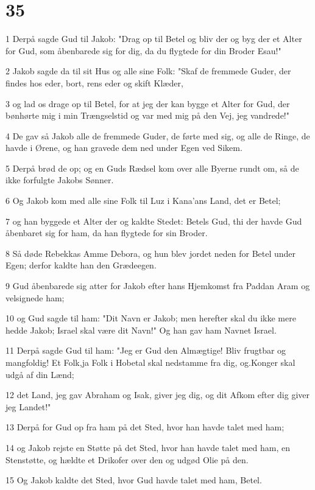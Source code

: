 \chapter{35}

\par 1 Derpå sagde Gud til Jakob: "Drag op til Betel og bliv der og byg der et Alter for Gud, som åbenbarede sig for dig, da du flygtede for din Broder Esau!"
\par 2 Jakob sagde da til sit Hus og alle sine Folk: "Skaf de fremmede Guder, der findes hos eder, bort, rens eder og skift Klæder,
\par 3 og lad os drage op til Betel, for at jeg der kan bygge et Alter for Gud, der bønhørte mig i min Trængselstid og var med mig på den Vej, jeg vandrede!"
\par 4 De gav så Jakob alle de fremmede Guder, de førte med sig, og alle de Ringe, de havde i Ørene, og han gravede dem ned under Egen ved Sikem.
\par 5 Derpå brød de op; og en Guds Rædsel kom over alle Byerne rundt om, så de ikke forfulgte Jakobs Sønner.
\par 6 Og Jakob kom med alle sine Folk til Luz i Kana'ans Land, det er Betel;
\par 7 og han byggede et Alter der og kaldte Stedet: Betels Gud, thi der havde Gud åbenbaret sig for ham, da han flygtede for sin Broder.
\par 8 Så døde Rebekkas Amme Debora, og hun blev jordet neden for Betel under Egen; derfor kaldte han den Grædeegen.
\par 9 Gud åbenbarede sig atter for Jakob efter hans Hjemkomst fra Paddan Aram og velsignede ham;
\par 10 og Gud sagde til ham: "Dit Navn er Jakob; men herefter skal du ikke mere hedde Jakob; Israel skal være dit Navn!" Og han gav ham Navnet Israel.
\par 11 Derpå sagde Gud til ham: "Jeg er Gud den Almægtige! Bliv frugtbar og mangfoldig! Et Folk,ja Folk i Hobetal skal nedstamme fra dig, og.Konger skal udgå af din Lænd;
\par 12 det Land, jeg gav Abraham og Isak, giver jeg dig, og dit Afkom efter dig giver jeg Landet!"
\par 13 Derpå for Gud op fra ham på det Sted, hvor han havde talet med ham;
\par 14 og Jakob rejste en Støtte på det Sted, hvor han havde talet med ham, en Stenstøtte, og hældte et Drikofer over den og udgød Olie på den.
\par 15 Og Jakob kaldte det Sted, hvor Gud havde talet med ham, Betel.
